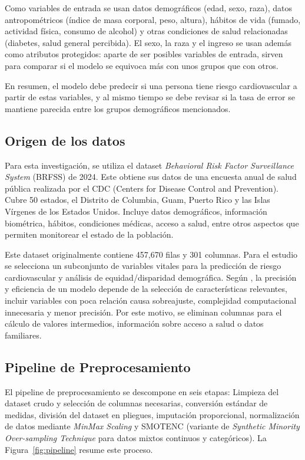 \documentclass[conference]{IEEEtran}
\begin{document}
Como variables de entrada se usan datos demográficos (edad, sexo, raza), datos antropométricos (índice de masa corporal, peso, altura), hábitos de vida (fumado, actividad física, consumo de alcohol) y otras condiciones de salud relacionadas (diabetes, salud general percibida). El sexo, la raza y el ingreso se usan además como atributos protegidos: aparte de ser posibles variables de entrada, sirven para comparar si el modelo se equivoca más con unos grupos que con otros.

En resumen, el modelo debe predecir si una persona tiene riesgo cardiovascular a partir de estas variables, y al mismo tiempo se debe revisar si la tasa de error se mantiene parecida entre los grupos demográficos mencionados.

\subsection{Origen de los datos}

Para esta investigación, se utiliza el dataset \textit{Behavioral Risk Factor Surveillance System} (BRFSS) de 2024. Este obtiene sus datos de una encuesta anual de salud pública realizada por el CDC (Centers for Disease Control and Prevention). Cubre 50 estados, el Distrito de Columbia, Guam, Puerto Rico y las Islas Vírgenes de los Estados Unidos. Incluye datos demográficos, información biométrica, hábitos, condiciones médicas, acceso a salud, entre otros aspectos que permiten monitorear el estado de la población.

Este dataset originalmente contiene 457,670 filas y 301 columnas. Para el estudio se selecciona un subconjunto de variables vitales para la predicción de riesgo cardiovascular y análisis de equidad/disparidad demográfica. Según \cite{sathyaseelan2025comparative}, la precisión y eficiencia de un modelo depende de la selección de características relevantes, incluir variables con poca relación causa sobreajuste, complejidad computacional innecesaria y menor precisión. Por este motivo, se eliminan columnas para el cálculo de valores intermedios, información sobre acceso a salud o datos familiares.

\subsection{Pipeline de Preprocesamiento}

El pipeline de preprocesamiento se descompone en seis etapas: Limpieza del dataset crudo y selección de columnas necesarias, conversión estándar de medidas, división del dataset en pliegues, imputación proporcional, normalización de datos mediante \textit{MinMax Scaling} y SMOTENC (variante de \textit{Synthetic Minority Over-sampling Technique} para datos mixtos continuos y categóricos). La Figura~\ref{fig:pipeline} resume este proceso.
\end{document}
